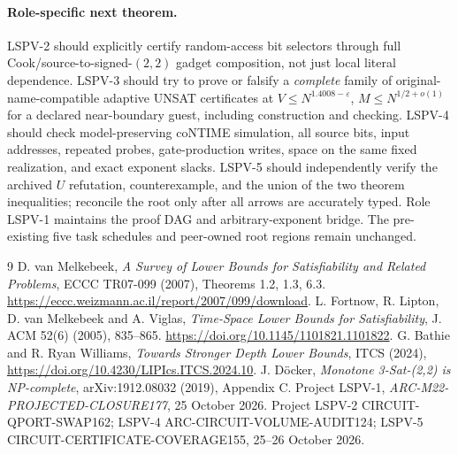 \documentclass[11pt]{article}
\begin{document}
\paragraph{Role-specific next theorem.}
LSPV-2 should explicitly certify random-access bit selectors through
full Cook/source-to-signed-$(2,2)$ gadget composition, not just local
literal dependence. LSPV-3 should try to prove or falsify a \emph{complete}
family of original-name-compatible adaptive UNSAT certificates at
$V\le N^{1.4008-\varepsilon}$, $M\le N^{1/2+o(1)}$ for a declared
near-boundary guest, including construction and checking. LSPV-4 should
check model-preserving coNTIME simulation, all source bits, input
addresses, repeated probes, gate-production writes, space on the same
fixed realization, and exact exponent slacks. LSPV-5 should independently
verify the archived $U$ refutation, counterexample, and the union of the
two theorem inequalities; reconcile the root only after all arrows
are accurately typed. Role LSPV-1 maintains the proof DAG and
arbitrary-exponent bridge. The pre-existing five task schedules
and peer-owned root regions remain unchanged.

\begin{thebibliography}{9}
 D. van Melkebeek,
\emph{A Survey of Lower Bounds for Satisfiability and Related Problems},
ECCC TR07-099 (2007), Theorems 1.2, 1.3, 6.3.
\url{https://eccc.weizmann.ac.il/report/2007/099/download}.
 L. Fortnow, R. Lipton, D. van Melkebeek and A. Viglas,
\emph{Time-Space Lower Bounds for Satisfiability}, J. ACM 52(6)
(2005), 835--865. \url{https://doi.org/10.1145/1101821.1101822}.
 G. Bathie and R. Ryan Williams,
\emph{Towards Stronger Depth Lower Bounds}, ITCS (2024),
\url{https://doi.org/10.4230/LIPIcs.ITCS.2024.10}.
 J. D\"ocker, \emph{Monotone 3-Sat-(2,2) is NP-complete},
arXiv:1912.08032 (2019), Appendix C.
 Project LSPV-1,
\emph{ARC-M22-PROJECTED-CLOSURE177}, 25 October 2026.
 Project LSPV-2 CIRCUIT-QPORT-SWAP162;
LSPV-4 ARC-CIRCUIT-VOLUME-AUDIT124;
LSPV-5 CIRCUIT-CERTIFICATE-COVERAGE155, 25--26 October 2026.
\end{thebibliography}
\end{document}
